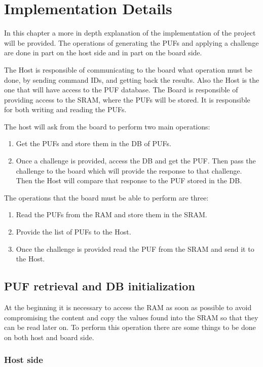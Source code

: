 \chapter{Implementation Details}
In this chapter a more in depth explanation of the implementation of the project will be provided. The operations of generating the PUFs and applying a challenge are done in part on the host side and in part on the board side.

The Host is responsible of communicating to the board what operation must be done, by sending command IDs, and getting back the results. Also the Host is the one that will have access to the PUF database.
The Board is responsible of providing access to the SRAM, where the PUFs will be stored. It is responsible for both writing and reading the PUFs.

The host will ask from the board to perform two main operations:
\begin{enumerate}
	\item Get the PUFs and store them in the DB of PUFs.
	\item Once a challenge is provided, access the DB and get the PUF. Then pass the challenge to the board which will provide the response to that challenge. Then the Host will compare that response to the PUF stored in the DB.
\end{enumerate}

The operations that the board must be able to perform are three:
\begin{enumerate}
	\item Read the PUFs from the RAM and store them in the SRAM.
	\item Provide the list of PUFs to the Host.
	\item Once the challenge is provided read the PUF from the SRAM and send it to the Host.
\end{enumerate}

\section {PUF retrieval and DB initialization}

At the beginning it is necessary to access the RAM as soon as possible to avoid compromising the content and copy the values found into the SRAM so that they can be read later on. To perform this operation there are some things to be done on both host and board side.

\subsection{Host side}

